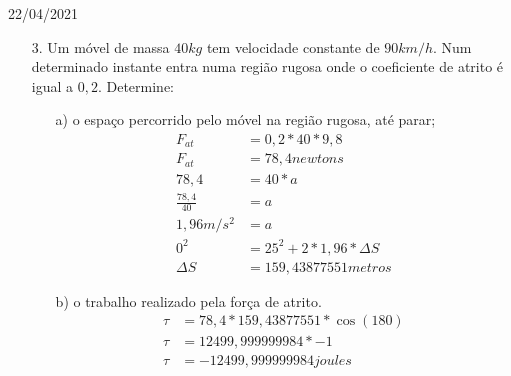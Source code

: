 \documentclass{SchoolBook}
\begin{document}
\begin{day}{22/04/2021}
\begin{enumerate}
            \item[3.] Um móvel de massa $ 40 kg $ tem velocidade constante de $ 90 km/h $.
            Num determinado instante entra numa região rugosa onde o coeficiente de atrito é igual a $ 0,2 $. Determine:
            \begin{enumerate}
                \item[a)] o espaço percorrido pelo móvel na região rugosa, até parar;
                \begin{align*}
                             F_{at} &= 0,2 * 40 * 9,8             \\
                             F_{at} &= 78,4 newtons               \\
                               78,4 &= 40 * a                     \\
                    \frac{78,4}{40} &= a                          \\
                         1,96 m/s^2 &= a                          \\
                                0^2 &= 25^2 + 2 * 1,96 * \Delta S \\
                           \Delta S &= 159,43877551 metros
                \end{align*}
                
                \item[b)] o trabalho realizado pela força de atrito.
                \begin{align*}
                    \tau &= 78,4 * 159,43877551 * \cos(180) \\
                    \tau &= 12499,999999984 * -1            \\
                    \tau &= -12499,999999984 joules
                \end{align*}
            \end{enumerate}
        \end{enumerate}
    \end{day}
    
\end{document}
